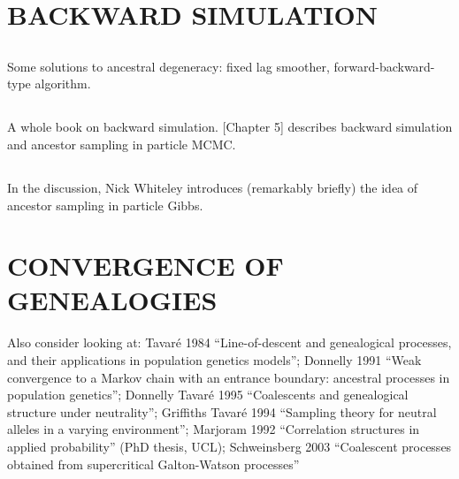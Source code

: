 \documentclass{article}
\begin{document}
\subsection*{\cite{webber2019}}

\subsection*{\cite{delmoral2012}}


%
\section*{BACKWARD SIMULATION}

\subsection*{\cite{kitagawa1996}}
Some solutions to ancestral degeneracy: fixed lag smoother, forward-backward-type algorithm.

\subsection*{\cite{doucet2009}}


\subsection*{\cite{lindsten2013}}
A whole book on backward simulation. [Chapter 5] describes backward simulation and ancestor sampling in particle MCMC.

\subsection*{\cite{whiteley2010}}
In the discussion, Nick Whiteley introduces (remarkably briefly) the idea of ancestor sampling in particle Gibbs.





\section*{CONVERGENCE OF GENEALOGIES}

Also consider looking at: 
Tavar\'e 1984 ``Line-of-descent and genealogical processes, and their applications in population genetics models''; 
Donnelly 1991 ``Weak convergence to  a Markov chain with an entrance boundary: ancestral processes in population genetics''; 
Donnelly Tavar\'e 1995 ``Coalescents and genealogical structure under neutrality''; 
Griffiths Tavar\'e 1994 ``Sampling theory for neutral alleles in a varying environment''; 
Marjoram 1992 ``Correlation structures in applied probability'' (PhD thesis, UCL);
Schweinsberg 2003 ``Coalescent processes obtained from supercritical Galton-Watson processes''
\end{document}
